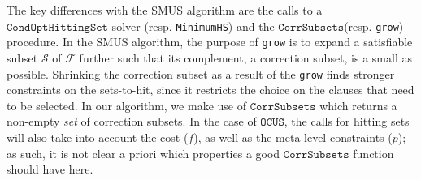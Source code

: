 \documentclass{llncs}
\newcommand\m[1]{\mathcal{#1}}
\newcommand\comment[1]{\marginpar{\tiny #1}}
\renewcommand\comment[1]{#1}
\newcommand{\tias}[1]{{\comment{\color{blue}Tias:#1}}}
\newcommand{\emilio}[1]{{\comment{\color{red}Emilio: #1}}}
\newcommand{\bart}[1]{{\comment{\color{OliveGreen}Bart: #1}}}
\newcommand\formula{\ensuremath{\m{F} }\xspace}
\newcommand\mm[1]{\ensuremath{#1}\xspace}
\newcommand\call[1]{\mm{\texttt{#1}}}
\newcommand\cohs{\mm{\call{CondOptHittingSet}}}
\newcommand\grow{\mm{\call{Grow}}}
\newcommand\comus{\mm{\call{OCUS}}}
\newcommand\corrsubsets{\mm{\call{CorrSubsets}}}
\begin{document}
The key differences with the SMUS algorithm are the calls to a \cohs solver (resp. \texttt{MinimumHS}) and the \corrsubsets (resp. \texttt{grow}) procedure.
In the SMUS algorithm, the purpose of \texttt{grow} is to expand a satisfiable subset $\m{S}$ of $\m{F}$ further such that its complement, a correction subset, is a small as possible.
Shrinking the correction subset as a result of the \texttt{grow} finds stronger constraints on the sets-to-hit, since it restricts the choice on the clauses that need to be selected. 
In our algorithm, we make use of \corrsubsets which returns a non-empty \emph{set} of correction subsets. 
In the case of \comus, the calls for hitting sets will also take into account the cost ($f$), as well as the meta-level constraints ($p$); as such, it is not clear a priori which properties a good \corrsubsets function should have here.
\end{document}
